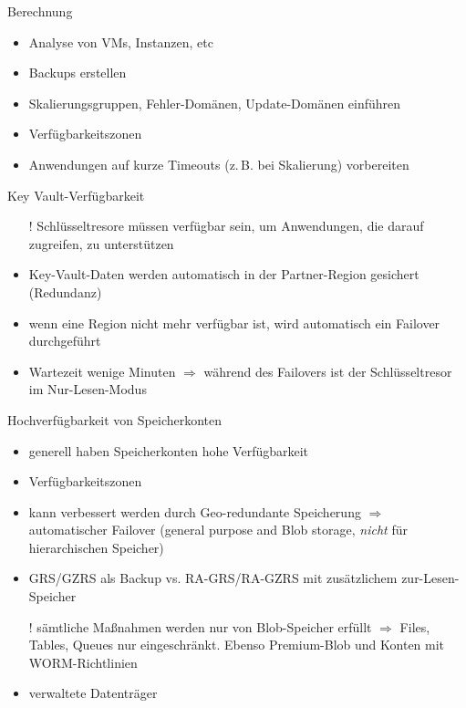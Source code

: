 \begin{flashcard}[]{Berechnung}
  \begin{itemize}
    \item Analyse von VMs, Instanzen, etc
    \item Backups erstellen
    \item Skalierungsgruppen, Fehler-Domänen, Update-Domänen einführen
    \item Verfügbarkeitszonen
    \item Anwendungen auf kurze Timeouts (z.\,B. bei Skalierung) vorbereiten
  \end{itemize}
\end{flashcard}

\begin{flashcard}[]{Key Vault-Verfügbarkeit}
  \begin{itemize}
    \item[!] Schlüsseltresore müssen verfügbar sein, um Anwendungen, die darauf zugreifen, zu unterstützen
    \item Key-Vault-Daten werden automatisch in der Partner-Region gesichert (Redundanz)
    \item wenn eine Region nicht mehr verfügbar ist, wird automatisch ein Failover durchgeführt
    \item Wartezeit wenige Minuten\newline
      $\Rightarrow$ während des Failovers ist der Schlüsseltresor im Nur-Lesen-Modus
  \end{itemize}
\end{flashcard}


\begin{flashcard}[]{Hochverfügbarkeit von Speicherkonten}
  \begin{itemize}
    \item generell haben Speicherkonten hohe Verfügbarkeit
    \item Verfügbarkeitszonen
    \item kann verbessert werden durch Geo-redundante Speicherung\newline
      $\Rightarrow$ automatischer Failover (general purpose and Blob storage, \emph{nicht} für hierarchischen Speicher)
    \item GRS/GZRS als Backup vs. RA-GRS/RA-GZRS mit zusätzlichem zur-Lesen-Speicher
    \item[!] sämtliche Maßnahmen werden nur von Blob-Speicher erfüllt\newline
      $\Rightarrow$ Files, Tables, Queues nur eingeschränkt. Ebenso Premium-Blob und Konten mit WORM-Richtlinien
    \item verwaltete Datenträger
  \end{itemize}
\end{flashcard}
